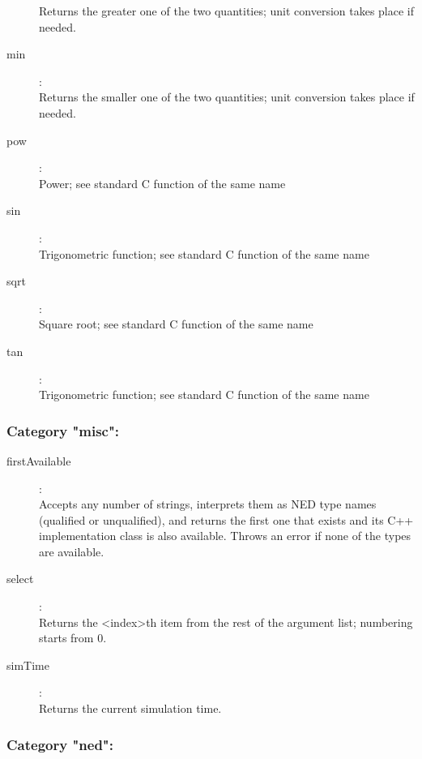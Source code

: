 \begin{description}
    Returns the greater one of the two quantities; unit conversion takes place if needed.
\item[min]:  \\
    Returns the smaller one of the two quantities; unit conversion takes place if needed.
\item[pow]:  \\
    Power; see standard C function of the same name
\item[sin]:  \\
    Trigonometric function; see standard C function of the same name
\item[sqrt]:  \\
    Square root; see standard C function of the same name
\item[tan]:  \\
    Trigonometric function; see standard C function of the same name

\end{description}

\subsubsection{Category "misc":}

\begin{description}
\item[firstAvailable]:  \\
    Accepts any number of strings, interprets them as NED type names (qualified or unqualified), and returns the first one that exists and its C++ implementation class is also available. Throws an error if none of the types are available.
\item[select]:  \\
    Returns the <index>th item from the rest of the argument list; numbering starts from 0.
\item[simTime]:  \\
    Returns the current simulation time.
\end{description}

\subsubsection{Category "ned":}


